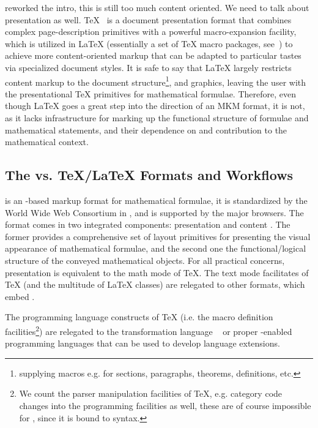 \begin{newpart}{reworked the intro, this is still too much content oriented. We need to
    talk about presentation as well. }
{\TeX}~\cite{Knuth:ttb84} is a document presentation format that combines complex
page-description primitives with a powerful macro-expansion facility, which is utilized in
{\LaTeX} (essentially a set of {\TeX} macro packages, see~\cite{Lamport:ladps94}) to
achieve more content-oriented markup that can be adapted to particular tastes via
specialized document styles. It is safe to say that {\LaTeX} largely restricts content
markup to the document structure\footnote{supplying macros e.g. for sections, paragraphs,
  theorems, definitions, etc.}, and graphics, leaving the user with the presentational
{\TeX} primitives for mathematical formulae. Therefore, even though {\LaTeX} goes a great
step into the direction of an MKM format, it is not, as it lacks infrastructure for
marking up the functional structure of formulae and mathematical statements, and their
dependence on and contribution to the mathematical context.

\subsection{The {\xml} vs. {\TeX/\LaTeX} Formats and Workflows}

{\mathml} is an {\xml}-based markup format for mathematical formulae, it is standardized
by the World Wide Web Consortium in {\cite{CarIon:MathML03}}, and is supported by the
major browsers. The {\mathml} format comes in two integrated components: presentation
{\mathml} and content {\mathml}. The
former provides a comprehensive set of layout primitives for presenting the visual
appearance of mathematical formulae, and the second one the functional/logical structure
of the conveyed mathematical objects. For all practical concerns, presentation {\mathml}
is equivalent to the math mode of {\TeX}. The text mode facilitates of {\TeX} (and the
multitude of {\LaTeX} classes) are relegated to other {\xml} formats, which embed
{\mathml}.
 
The programming language constructs of {\TeX} (i.e. the macro definition
facilities\footnote{We count the parser manipulation facilities of {\TeX}, e.g. category
  code changes into the programming facilities as well, these are of course impossible for
  {\mathml}, since it is bound to {\xml} syntax.}) are relegated to the {\xml}
transformation language {\xslt}~\cite{Deach:exls99,Kay:xslt} or proper {\xml}-enabled
programming languages that can be used to develop language extensions.


\end{newpart}
